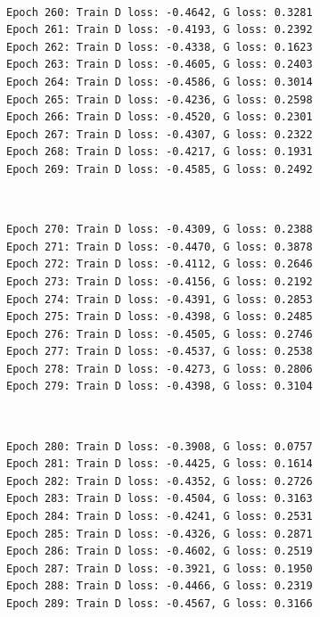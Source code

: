 \documentclass[11pt]{article}
\begin{document}
    \begin{center}
    \end{center}
    { \hspace*{\fill} \\}
    
    \begin{Verbatim}[commandchars=\\\{\}]
Epoch 260: Train D loss: -0.4642, G loss: 0.3281
Epoch 261: Train D loss: -0.4193, G loss: 0.2392
Epoch 262: Train D loss: -0.4338, G loss: 0.1623
Epoch 263: Train D loss: -0.4605, G loss: 0.2403
Epoch 264: Train D loss: -0.4586, G loss: 0.3014
Epoch 265: Train D loss: -0.4236, G loss: 0.2598
Epoch 266: Train D loss: -0.4520, G loss: 0.2301
Epoch 267: Train D loss: -0.4307, G loss: 0.2322
Epoch 268: Train D loss: -0.4217, G loss: 0.1931
Epoch 269: Train D loss: -0.4585, G loss: 0.2492

    \end{Verbatim}

    \begin{center}
    \end{center}
    { \hspace*{\fill} \\}
    
    \begin{Verbatim}[commandchars=\\\{\}]
Epoch 270: Train D loss: -0.4309, G loss: 0.2388
Epoch 271: Train D loss: -0.4470, G loss: 0.3878
Epoch 272: Train D loss: -0.4112, G loss: 0.2646
Epoch 273: Train D loss: -0.4156, G loss: 0.2192
Epoch 274: Train D loss: -0.4391, G loss: 0.2853
Epoch 275: Train D loss: -0.4398, G loss: 0.2485
Epoch 276: Train D loss: -0.4505, G loss: 0.2746
Epoch 277: Train D loss: -0.4537, G loss: 0.2538
Epoch 278: Train D loss: -0.4273, G loss: 0.2806
Epoch 279: Train D loss: -0.4398, G loss: 0.3104

    \end{Verbatim}

    \begin{center}
    \end{center}
    { \hspace*{\fill} \\}
    
    \begin{Verbatim}[commandchars=\\\{\}]
Epoch 280: Train D loss: -0.3908, G loss: 0.0757
Epoch 281: Train D loss: -0.4425, G loss: 0.1614
Epoch 282: Train D loss: -0.4352, G loss: 0.2726
Epoch 283: Train D loss: -0.4504, G loss: 0.3163
Epoch 284: Train D loss: -0.4241, G loss: 0.2531
Epoch 285: Train D loss: -0.4326, G loss: 0.2871
Epoch 286: Train D loss: -0.4602, G loss: 0.2519
Epoch 287: Train D loss: -0.3921, G loss: 0.1950
Epoch 288: Train D loss: -0.4466, G loss: 0.2319
Epoch 289: Train D loss: -0.4567, G loss: 0.3166

    \end{Verbatim}
\end{document}
